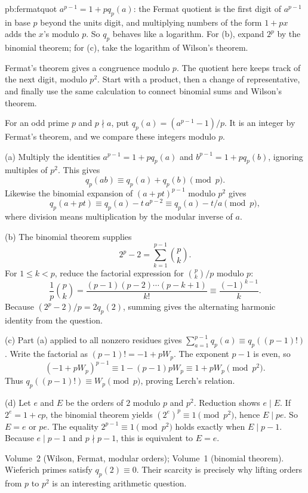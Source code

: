 \begin{solution}{pb:fermatquot}
\idea $a^{p-1}=1+pq_p(a)$: the Fermat quotient is the first digit of $a^{p-1}$ in base $p$ beyond the units digit, and
multiplying numbers of the form $1+px$ adds the $x$'s modulo $p$. So $q_p$ behaves like a logarithm. For (b), expand $2^p$ by the
binomial theorem; for (c), take the logarithm of Wilson's theorem.

\writeup
Fermat's theorem gives a congruence modulo $p$. The quotient here keeps track of the next digit, modulo $p^2$. Start with a product, then a change of representative, and finally use the same calculation to connect binomial sums and Wilson's theorem.

 For an odd prime $p$ and $p\nmid a$, put
$q_p(a)=(a^{p-1}-1)/p$. It is an integer by Fermat's theorem, and we compare these integers modulo $p$.

(a) Multiply the identities $a^{p-1}=1+pq_p(a)$ and $b^{p-1}=1+pq_p(b)$, ignoring multiples of $p^2$. This gives
\[
q_p(ab)\equiv q_p(a)+q_p(b)\pmod p.
\]
Likewise the binomial expansion of $(a+pt)^{p-1}$ modulo $p^2$ gives
\[
q_p(a+pt)\equiv q_p(a)-t\,a^{p-2}
\equiv q_p(a)-t/a\pmod p,
\]
where division means multiplication by the modular inverse of $a$.

(b) The binomial theorem supplies
\[
2^p-2=\sum_{k=1}^{p-1}\binom pk.
\]
For $1\le k<p$, reduce the factorial expression for $\binom pk/p$ modulo $p$:
\[
\frac1p\binom pk
=\frac{(p-1)(p-2)\cdots(p-k+1)}{k!}
\equiv\frac{(-1)^{k-1}}k.
\]
Because $(2^p-2)/p=2q_p(2)$, summing gives the alternating harmonic identity from the question.

(c) Part (a) applied to all nonzero residues gives
$\sum_{a=1}^{p-1}q_p(a)\equiv q_p((p-1)!)$. Write the factorial as
$(p-1)!=-1+pW_p$. The exponent $p-1$ is even, so
\[
(-1+pW_p)^{p-1}\equiv1-(p-1)pW_p
\equiv1+pW_p\pmod{p^2}.
\]
Thus $q_p((p-1)!)\equiv W_p\pmod p$, proving Lerch's relation.

(d) Let $e$ and $E$ be the orders of $2$ modulo $p$ and $p^2$. Reduction shows $e\mid E$. If $2^e=1+cp$, the binomial theorem yields
$(2^e)^p\equiv1\pmod{p^2}$, hence $E\mid pe$. So $E=e$ or $pe$. The equality
$2^{p-1}\equiv1\pmod{p^2}$ holds exactly when $E\mid p-1$. Because $e\mid p-1$ and $p\nmid p-1$, this is equivalent to $E=e$.

\tools Volume~2 (Wilson, Fermat, modular orders); Volume~1 (binomial theorem).
\leads Wieferich primes satisfy $q_p(2)\equiv0$. Their scarcity is precisely why lifting orders from $p$ to $p^2$ is an interesting arithmetic question.
\end{solution}

